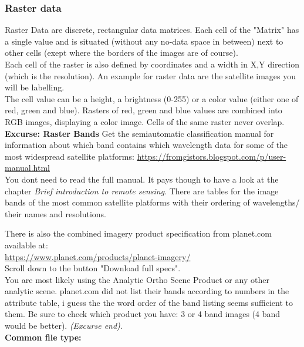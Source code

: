 \documentclass[12pt,a4paper]{scrartcl}
\begin{document}
\subsubsection{Raster data}
\label{rastabands}
Raster Data are discrete, rectangular data matrices.
Each cell of the "Matrix" has a single value and is situated (without any no-data space in between) next to other cells (exept where the borders of the images are of course). \\
Each cell of the raster is also defined by coordinates and a width in X,Y direction (which is the resolution).
An example for raster data are the satellite images you will be labelling. \\

The cell value can be a height, a brightness (0-255) or a color value (either one of red, green and blue).
Rasters of red, green and blue values are combined into RGB images, displaying a color image.  
Cells of the same raster never overlap. \\

\textbf{Excurse: Raster Bands} \newline
Get the semiautomatic classification manual for information about which band contains which wavelength data for 
some of the most widespread satellite platforms: 
\url{https://fromgistors.blogspot.com/p/user-manual.html}\\

You dont need to read the full manual. 
It pays though to have a look at the chapter \textit{Brief introduction to remote sensing}.
There are tables for the image bands of the most common satellite platforms with their ordering of wavelengths/ their names and resolutions.

There is also the combined imagery product specification from planet.com available at: \\
\url{https://www.planet.com/products/planet-imagery/} \\
Scroll down to the button "Download full specs". \\
You are most likely using the Analytic Ortho Scene Product or any other analytic scene.
planet.com did not list their bands according to numbers in the attribute table, i guess the the word order of the band listing seems sufficient to them.
Be sure to check which product you have: 3 or 4 band images (4 band would be better).  
\textit{(Excurse end)}. \\

\textbf{Common file type:} \\
\end{document}
